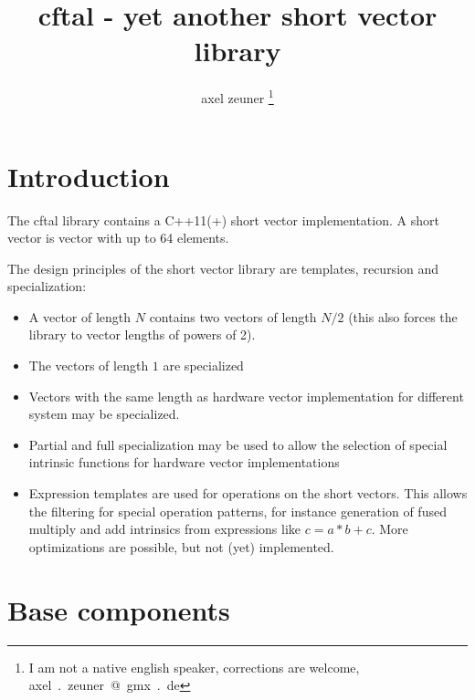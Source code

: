 \documentclass[10pt,a4paper,final,oneside]{article}
\numberwithin{equation}{subsection}
\begin{document}
\title{cftal - yet another short vector library}
\author{axel zeuner
\footnote{I am not a native english speaker, corrections are welcome, axel\ .\ zeuner\ @\ gmx\ .\ de}}
\maketitle
\setcounter{tocdepth}{4}
\setcounter{secnumdepth}{3}

\tableofcontents

\section{Introduction}
\label{sec:introduction}

The cftal library contains a C++11(+) short vector implementation. A
short vector is vector with up to 64 elements.

The design principles of the short vector library are
templates, recursion and specialization:
\begin{itemize}
\item A vector of length $N$ contains two vectors of length $N/2$
  (this also forces the library to vector lengths of powers of 2).
\item The vectors of length $1$ are specialized
\item Vectors with the same length as hardware vector implementation
  for different system may be specialized.
\item Partial and full specialization may be used to allow the
  selection of special intrinsic functions for hardware vector
  implementations
\item Expression templates are used for operations on the short
  vectors. This allows the filtering for special operation patterns,
  for instance generation of fused multiply and add intrinsics from
  expressions like $ c= a* b + c $. More optimizations are possible,
  but not (yet) implemented.
\end{itemize}

\section{Base components}
\label{sec:base}
\end{document}
